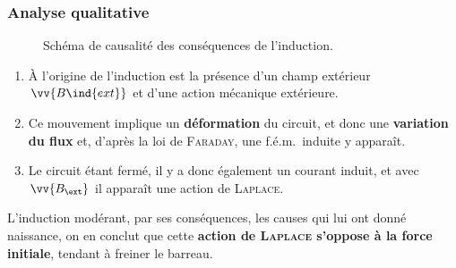 \documentclass[../../main/main.tex]{subfiles}
\begin{document}
\subsubsection{Analyse qualitative}
\label{ssec:rlplgene_anaqual}
\begin{figure}[h]
	\centering
	\caption{Schéma de causalité des conséquences de l'induction.}
	\label{fig:modlenz_rlplgene}
\end{figure}
\begin{enumerate}
	\item À l'origine de l'induction est la présence d'un champ extérieur
	      $\vv{B\ind{ext}}$ et d'une action mécanique extérieure.

	\item Ce mouvement implique un \textbf{déformation} du circuit, et donc une
	      \textbf{variation du flux} et, d'après la loi de \textsc{Faraday}, une
	      f.é.m.\ induite y apparaît.

	\item Le circuit étant fermé, il y a donc également un courant induit, et avec
	      $\vv{B_{\ext}}$ il apparaît une action de \textsc{Laplace}.
\end{enumerate}

L'induction modérant, par ses conséquences, les causes qui lui ont donné
naissance, on en conclut que cette \textbf{action de \textsc{Laplace} s'oppose à
	la force initiale}, tendant à freiner le barreau.
\end{document}
